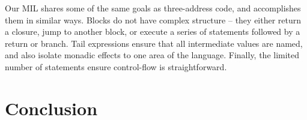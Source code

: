 \documentclass[12pt]{report}
\begin{document}
Our MIL shares some of the same goals as three-address code, and
accomplishes them in similar ways. Blocks do not have complex
structure -- they either return a closure, jump to another block, or
execute a series of statements followed by a return or branch. Tail
expressions ensure that all intermediate values are named, and also 
isolate monadic effects to one area of the language. Finally, the limited
number of statements ensure control-flow is straightforward.

\section{Conclusion}







\end{document}
